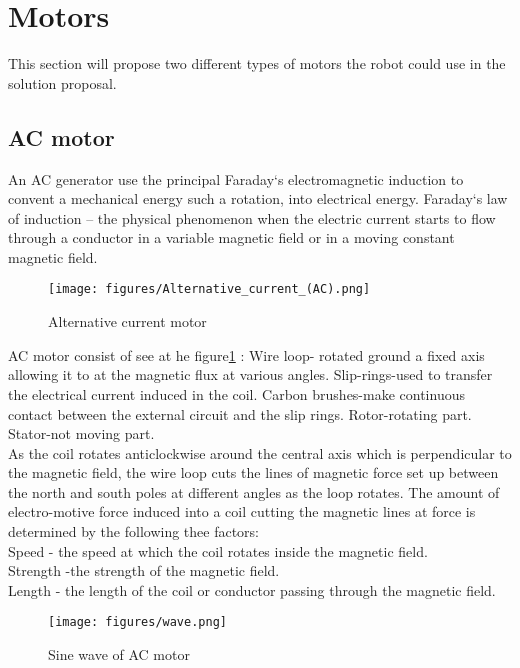 \section{Motors}
This section will propose two different types of motors the robot could use in the solution proposal.

\subsection{AC motor}
An AC generator use the principal Faraday‘s electromagnetic induction to convent a mechanical energy such a rotation, into electrical energy. Faraday‘s law of induction – the physical phenomenon when the electric current starts to flow through a conductor in a variable magnetic field or in a moving constant magnetic field. \\

\begin{figure}[h]
    \centering
    \texttt{[image: figures/Alternative\_current\_(AC).png]}
    \caption{Alternative current motor } 
    \label{fig:ACmotor} 
\end{figure}

AC motor consist of see at he figure\ref{fig:ACmotor} : Wire loop- rotated ground a fixed axis allowing it to at the magnetic flux at various angles.
Slip-rings-used to transfer the electrical current induced in the coil.
Carbon brushes-make continuous contact between the external circuit and the slip rings.
Rotor-rotating part.
Stator-not moving part.\\
As the coil rotates anticlockwise around the central axis which is perpendicular to the magnetic field, the wire loop cuts the lines of magnetic force set up between the north and south poles at different angles as the loop rotates.
The amount of electro-motive force induced into a coil cutting the magnetic lines at force is determined by the following thee factors:\\
Speed - the speed at which the coil rotates inside the magnetic field.\\
Strength -the strength of the magnetic field.\\
Length - the length of the coil or conductor passing through the magnetic field.\\

\begin{figure}[h]
    \centering
    \texttt{[image: figures/wave.png]}
    \caption{Sine wave of AC motor \cite{ACmotor3}} 
    \label{fig:ACmotor1} 
\end{figure}

